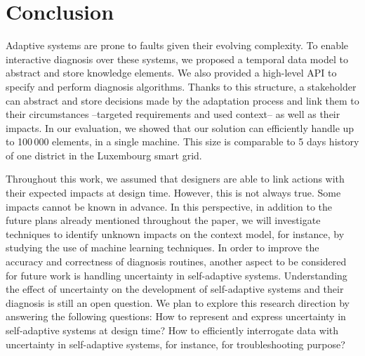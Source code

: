 \section{Conclusion}
\label{sec:tkm:conclusion}

Adaptive systems are prone to faults  given their evolving complexity.
To enable interactive diagnosis over these systems, we proposed a temporal data model to abstract and store knowledge elements. We also provided a high-level API to specify and perform diagnosis algorithms.
Thanks to this structure, a stakeholder can abstract and store decisions made by the adaptation process and link them to their circumstances --targeted requirements and used context-- as well as their impacts.
In our evaluation, we showed that our solution can efficiently handle up to 100\,000 elements, in a single machine.
This size is comparable to 5 days history of one district in the Luxembourg smart grid.


Throughout this work, we assumed that designers are able to link actions with their expected impacts at design time. However, this is not always true. Some impacts  cannot be known in advance.
In this perspective, in addition to the future plans already mentioned throughout the paper, we will investigate techniques to identify unknown impacts on the context model, for instance, by studying the use of machine learning  techniques.
In order to improve the accuracy and correctness of diagnosis routines, another aspect to be considered for future work is handling uncertainty in self-adaptive systems.
Understanding the effect of uncertainty on the development of self-adaptive systems and their diagnosis is still an open question.
We plan to explore this research direction by answering the following questions: How to represent and express uncertainty in self-adaptive systems at design time?
How to efficiently interrogate data with uncertainty in self-adaptive systems,  for instance, for troubleshooting purpose?